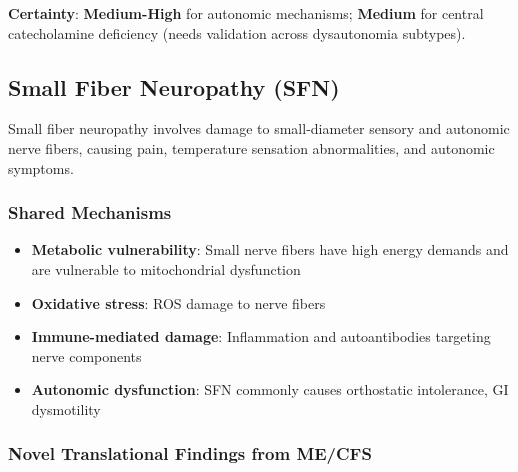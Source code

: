 \textbf{Certainty}: \textbf{Medium-High} for autonomic mechanisms; \textbf{Medium} for central catecholamine deficiency (needs validation across dysautonomia subtypes).

\subsection{Small Fiber Neuropathy (SFN)}
\label{sec:sfn-translational}

Small fiber neuropathy involves damage to small-diameter sensory and autonomic nerve fibers, causing pain, temperature sensation abnormalities, and autonomic symptoms.

\subsubsection{Shared Mechanisms}

\begin{itemize}
    \item \textbf{Metabolic vulnerability}: Small nerve fibers have high energy demands and are vulnerable to mitochondrial dysfunction
    \item \textbf{Oxidative stress}: ROS damage to nerve fibers
    \item \textbf{Immune-mediated damage}: Inflammation and autoantibodies targeting nerve components
    \item \textbf{Autonomic dysfunction}: SFN commonly causes orthostatic intolerance, GI dysmotility
\end{itemize}

\subsubsection{Novel Translational Findings from ME/CFS}

